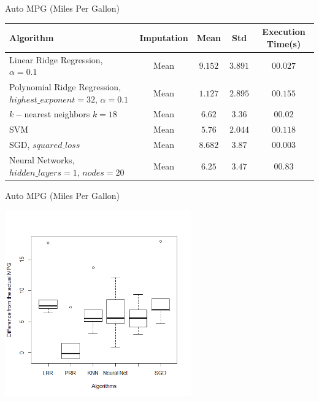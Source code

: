 \begin{frame}{Auto MPG (Miles Per Gallon)}
\begin{tcolorbox}[colback=LightSteelBlue!5,colframe=yellow!40!black,title=Final
Comparison]


\begin{table}
\centering
\resizebox{\columnwidth}{!}
	{
		\begin{tabular}{|p{4cm}|c|c|c|c|}
		\hline Algorithm & Imputation &  Mean &  Std & Execution Time(s)\\
		
		\hline Linear Ridge Regression, $\alpha=0.1$ & Mean & $9.152$ & $3.891$ & $00.027$ \\
		
		\hline Polynomial Ridge Regression, $highest\_exponent=32$, $\alpha=0.1$ &
		Mean & $\mathbf{1.127}$ & $2.895$ & $00.155$  \\
		
		\hline $k-$nearest neighbors $k=18$ & Mean & $6.62$ & $3.36$ &
		$00.02$  \\
		
		\hline SVM & Mean & $5.76$ & $\mathbf{2.044}$ & $00.118$  \\
		
		\hline SGD, $squared\_loss$ & Mean & $8.682$ & $3.87$ & $\mathbf{00.003}$  \\
		
		\hline Neural Networks, $hidden\_layers=1$, $nodes=20$ & Mean & $6.25$ &
		$3.47$ & $00.83$  \\
		
		\hline
		\end{tabular}
	}



\end{table}



\end{tcolorbox}
\end{frame}

\begin{frame}{Auto MPG (Miles Per Gallon)}
\begin{center}
\includegraphics[height=8cm]{../doc/src/report1/figures/mpg_bestresults.png}
\end{center}

\end{frame}

